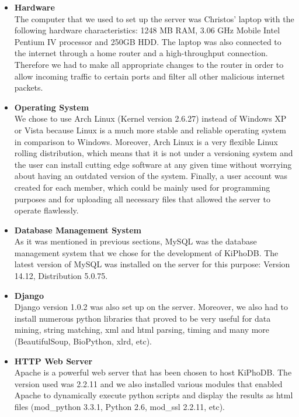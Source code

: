 \begin{itemize}
\item \textbf{Hardware} \\
The computer that we used to set up the server was Christos' laptop with the following hardware characteristics: 1248 MB RAM, 3.06 GHz Mobile Intel Pentium IV processor and 250GB HDD.
The laptop was also connected to the internet through a home router and a high-throughput connection.
Therefore we had to make all appropriate changes to the router in order to allow incoming traffic to certain ports and filter all other malicious internet packets.

\item \textbf{Operating System} \\
We chose to use Arch Linux (Kernel version 2.6.27) instead of Windows XP or Vista because Linux is a much more stable and reliable operating system in comparison to Windows.
Moreover, Arch Linux is a very flexible Linux rolling distribution, which means that it is not under a versioning system and the user can install cutting edge software at any given time without worrying about having an outdated version of the system.
Finally, a user account was created for each member, which could be mainly used for programming purposes and for uploading all necessary files that allowed the server to operate flawlessly.

\item \textbf{Database Management System} \\
As it was mentioned in previous sections, MySQL was the database management system that we chose for the development of KiPhoDB.
The latest version of MySQL was installed on the server for this purpose: Version 14.12, Distribution 5.0.75.

\item \textbf{Django} \\
Django version 1.0.2 was also set up on the server.
Moreover, we also had to install numerous python libraries that proved to be very useful for data mining, string matching, xml and html parsing, timing and many more (BeautifulSoup, BioPython, xlrd, etc).

\item \textbf{HTTP Web Server} \\
Apache is a powerful web server that has been chosen to host KiPhoDB.
The version used was 2.2.11 and we also installed various modules that enabled Apache to dynamically execute python scripts and display the results as html files (mod\_python 3.3.1, Python 2.6, mod\_ssl 2.2.11, etc).


\end{itemize}
